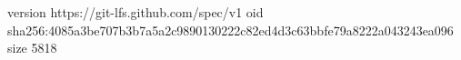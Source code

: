 version https://git-lfs.github.com/spec/v1
oid sha256:4085a3be707b3b7a5a2c9890130222c82ed4d3c63bbfe79a8222a043243ea096
size 5818
